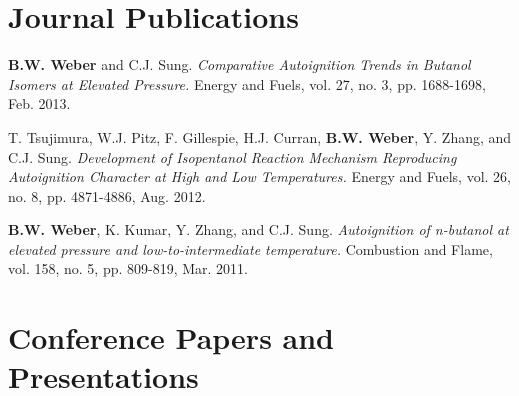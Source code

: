 \section{Journal Publications}

\begin{bibsection}
\item[] {\bf B.W. Weber} and C.J. Sung. {\em Comparative Autoignition Trends in Butanol Isomers at Elevated Pressure.} Energy and Fuels, vol. 27, no. 3, pp. 1688-1698, Feb. 2013. 
\item[] T. Tsujimura, W.J. Pitz, F. Gillespie, H.J. Curran, {\bf B.W. Weber}, Y. Zhang, and C.J. Sung. {\em Development of Isopentanol Reaction Mechanism Reproducing Autoignition Character at High and Low Temperatures.} Energy and Fuels, vol. 26, no. 8, pp. 4871-4886, Aug. 2012. 
\item[] {\bf B.W. Weber}, K. Kumar, Y. Zhang, and C.J. Sung. {\em Autoignition of n-butanol at elevated pressure and low-to-intermediate temperature.} Combustion and Flame, vol. 158, no. 5, pp. 809-819, Mar. 2011. 
\end{bibsection}

\vspace{0.1in}

\section{Conference Papers and Presentations}

